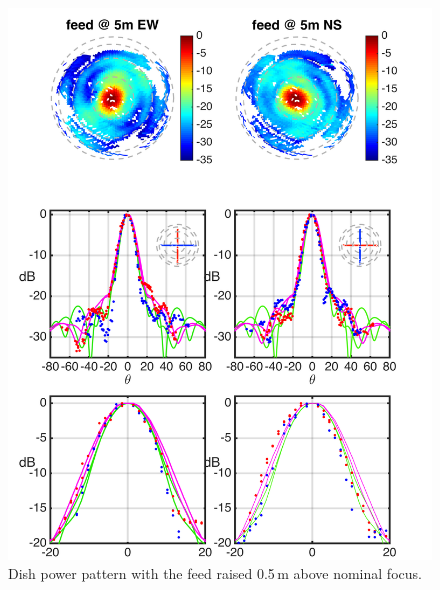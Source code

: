 \documentclass{emulateapj}
\begin{document}
\begin{figure}[h]
\includegraphics[width=6.5in]{dish2_abs_old_ref_model.png}
\caption{Dish power pattern with the feed raised 0.5\,m above nominal focus.}
\label{fig:dish2}
\end{figure}
\end{document}
